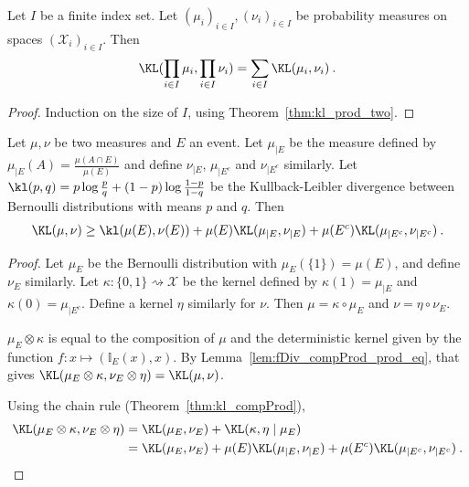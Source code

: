 \begin{theorem}
  \label{thm:kl_pi}
  \leanok
  Let $I$ be a finite index set. Let $(\mu_i)_{i \in I}, (\nu_i)_{i \in I}$ be probability measures on spaces $(\mathcal X_i)_{i \in I}$. Then
  \begin{align*}
  \KL(\prod_{i \in I} \mu_i, \prod_{i \in I} \nu_i) = \sum_{i \in I} \KL(\mu_i, \nu_i)
  \: .
  \end{align*}
\end{theorem}

\begin{proof} \leanok
{}
Induction on the size of $I$, using Theorem~\ref{thm:kl_prod_two}.
\end{proof}


\begin{lemma}
  \label{lem:kl_chain_rule_cond_event}
  Let $\mu, \nu$ be two measures and $E$ an event. Let $\mu_{|E}$ be the measure defined by $\mu_{|E}(A) = \frac{\mu(A \cap E)}{\mu(E)}$ and define $\nu_{|E}$, $\mu_{| E^c}$ and $\nu_{| E^c}$ similarly. Let $\kl(p,q) = p\log\frac{p}{q} + (1-p)\log\frac{1-p}{1-q}$ be the Kullback-Leibler divergence between Bernoulli distributions with means $p$ and $q$. Then
  \begin{align*}
  \KL(\mu, \nu) \ge \kl(\mu(E), \nu(E)) + \mu(E) \KL(\mu_{|E}, \nu_{|E}) + \mu(E^c) \KL(\mu_{|E^c}, \nu_{|E^c}) \: .
  \end{align*}
\end{lemma}

\begin{proof}
Let $\mu_E$ be the Bernoulli distribution with $\mu_E(\{1\}) = \mu(E)$, and define $\nu_E$ similarly.
Let $\kappa : \{0,1\} \rightsquigarrow \mathcal X$ be the kernel defined by $\kappa(1) = \mu_{|E}$ and $\kappa(0) = \mu_{|E^c}$. Define a kernel $\eta$ similarly for $\nu$.
Then $\mu = \kappa \circ \mu_E$ and $\nu = \eta \circ \nu_E$.

$\mu_E \otimes \kappa$ is equal to the composition of $\mu$ and the deterministic kernel given by the function $f : x \mapsto (\mathbb{I}_E(x), x)$. By Lemma~\ref{lem:fDiv_compProd_prod_eq}, that gives $\KL(\mu_E \otimes \kappa, \nu_E \otimes \eta) = \KL(\mu, \nu)$.

Using the chain rule (Theorem~\ref{thm:kl_compProd}),
\begin{align*}
\KL(\mu_E \otimes \kappa, \nu_E \otimes \eta)
&= \KL(\mu_E, \nu_E) + \KL(\kappa, \eta \mid \mu_E)
\\
&= \KL(\mu_E, \nu_E) + \mu(E) \KL(\mu_{|E}, \nu_{|E}) + \mu(E^c) \KL(\mu_{|E^c}, \nu_{|E^c})
\: .
\end{align*}

\end{proof}


